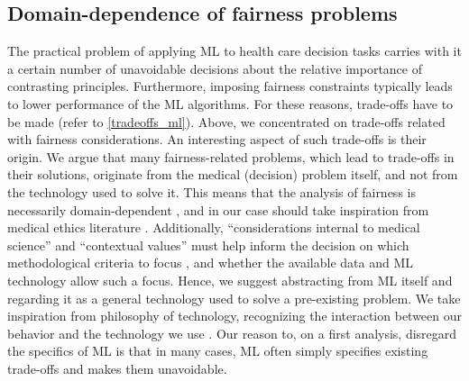 \subsection{Domain-dependence of fairness problems}
    The practical problem of applying ML to health care decision tasks carries with it a certain number of unavoidable decisions about the relative importance of contrasting principles.
    Furthermore, imposing fairness constraints typically leads to lower performance of the ML algorithms.
    For these reasons, trade-offs have to be made (refer to \ref{tradeoffs_ml}).
    Above, we concentrated on trade-offs related with fairness considerations.
    An interesting aspect of such trade-offs is their origin.
    We argue that many fairness-related problems, which lead to trade-offs in their solutions, originate from the medical (decision) problem itself, and not from the technology used to solve it.
    This means that the analysis of fairness is necessarily domain-dependent \cite{Fletcher2021}, and in our case should take inspiration from medical ethics literature \cite{Morley2020}.
    Additionally, ``considerations internal to medical science'' and ``contextual values'' must help inform the decision on which methodological criteria to focus \cite[p.~252]{Ho2011}, and whether the available data and ML technology allow such a focus.
    Hence, we suggest abstracting from ML itself and regarding it as a general technology used to solve a pre-existing problem.
    We take inspiration from philosophy of technology, recognizing the interaction between our behavior and the technology we use \cite{Dijkstra2020}.
    Our reason to, on a first analysis, disregard the specifics of ML is that in many cases, ML often simply specifies existing trade-offs and makes them unavoidable.

